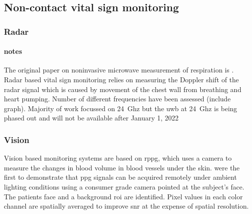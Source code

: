 \documentclass[11pt, parskip=half*,twoside=false]{scrbook}
\begin{document}
\subsection{Non-contact vital sign monitoring}


\subsubsection{Radar}
\paragraph{notes}
The original paper on noninvasive microwave measurement of respiration is  \citep{linNoninvasiveMicrowaveMeasurement1975}.  Radar based vital sign monitoring relies on measuring the Doppler shift of the radar signal which is caused by movement of the chest wall from breathing and heart pumping. Number of different frequencies have been assessed \citep{singhMultiResidentNonContactVital2021}(include graph). Majority of work focussed on 24~Ghz but the \gls{uwb} at 24~Ghz is being phased out and will not be available after January 1, 2022 \citep{ramasubramanianMovingLegacy242018}

\subsubsection{Vision}
Vision based monitoring systems are based on \gls{rppg}, which uses a camera to measure the changes in blood volume in blood vessels under the skin. \citet{verkruysseRemotePlethysmographicImaging2008} were the first to demonstrate that \gls{ppg} signals can be acquired remotely under ambient lighting conditions using a consumer grade camera pointed at the subject's face. The patients face and a background \gls{roi} are identified. Pixel values in each color channel are spatially averaged to improve \gls{snr} at the expense of spatial resolution. 
\end{document}
